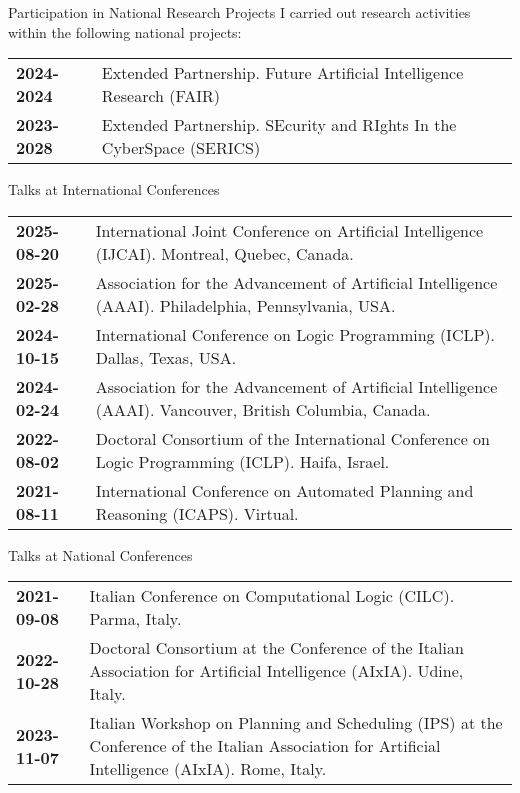 \documentclass{resume} %
\begin{document}
\begin{rSection}{Participation in National Research Projects}
I carried out research activities within the following national projects:\\
	\begin{tabularx}{0.95\textwidth} {lp{14cm}}
  \textbf{2024-2024} & Extended Partnership. Future Artificial Intelligence Research (FAIR)\\
 \textbf{2023-2028} & Extended Partnership. SEcurity and RIghts In the CyberSpace (SERICS)\\
 \end{tabularx}
\end{rSection}

\break

\begin{rSection}{Talks at International Conferences}
	\begin{tabularx}{0.95\textwidth} {lp{14cm}}
 \textbf{2025-08-20} & International Joint Conference on Artificial Intelligence (IJCAI). Montreal, Quebec, Canada.\\
 \textbf{2025-02-28} & Association for the Advancement of Artificial Intelligence (AAAI). Philadelphia, Pennsylvania, USA.\\
 \textbf{2024-10-15} & International Conference on Logic Programming (ICLP). Dallas, Texas, USA.\\
 \textbf{2024-02-24} & Association for the Advancement of Artificial Intelligence (AAAI). Vancouver, British Columbia, Canada.\\
 \textbf{2022-08-02} & Doctoral Consortium of the International Conference on Logic Programming (ICLP). Haifa, Israel.\\
 \textbf{2021-08-11} & International Conference on Automated Planning and Reasoning (ICAPS). Virtual.\\
 \end{tabularx}
 \end{rSection}
 

 \begin{rSection}{Talks at National Conferences}
	\begin{tabularx}{0.95\textwidth} {lp{14cm}}
 \textbf{2021-09-08} & Italian Conference on Computational Logic (CILC). Parma, Italy.\\
 \textbf{2022-10-28} & Doctoral Consortium at the Conference of the Italian Association for Artificial Intelligence (AIxIA). Udine, Italy.\\
 \textbf{2023-11-07} & Italian Workshop on Planning and Scheduling (IPS) at the Conference of the Italian Association for Artificial Intelligence (AIxIA). Rome, Italy.
  \end{tabularx}
 \end{rSection}
 
\end{document}
